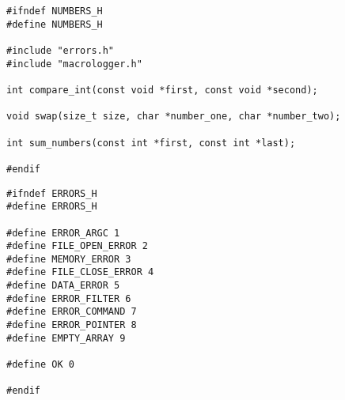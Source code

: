 \begin{center}
    \captionsetup{justification=raggedright,singlelinecheck=off}
    \begin{lstlisting}[label=lst:numbers,caption=numbers.h]
#ifndef NUMBERS_H
#define NUMBERS_H

#include "errors.h"
#include "macrologger.h"

int compare_int(const void *first, const void *second);

void swap(size_t size, char *number_one, char *number_two);

int sum_numbers(const int *first, const int *last);

#endif

\end{lstlisting}
\end{center}

\begin{center}
    \captionsetup{justification=raggedright,singlelinecheck=off}
    \begin{lstlisting}[label=lst:errors,caption=errors.h]
#ifndef ERRORS_H
#define ERRORS_H

#define ERROR_ARGC 1
#define FILE_OPEN_ERROR 2
#define MEMORY_ERROR 3
#define FILE_CLOSE_ERROR 4
#define DATA_ERROR 5
#define ERROR_FILTER 6
#define ERROR_COMMAND 7
#define ERROR_POINTER 8
#define EMPTY_ARRAY 9

#define OK 0

#endif
\end{lstlisting}
\end{center}